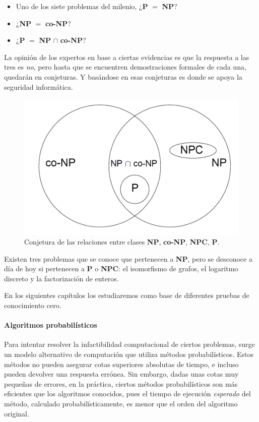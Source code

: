 \begin{itemize}
	\item Uno de los siete problemas del milenio, ¿\textbf{P} $=$ \textbf{NP}?
	\item ¿\textbf{NP} $=$ \textbf{co-NP}?
	\item ¿\textbf{P} $=$ \textbf{NP} $\cap$ \textbf{co-NP}?
\end{itemize}


La opinión de los expertos en base a ciertas evidencias es que la respuesta a las tres es \textit{no}, pero hasta que se encuentren demostraciones formales de cada una, quedarán en conjeturas. Y basándose en esas conjeturas es donde se apoya la seguridad informática.


\begin{figure}[bth]
	\begin{center}
		\includegraphics[width=.45\linewidth]{gfx/NPclasses}
	\end{center}
	\caption{Conjetura de las relaciones entre clases \textbf{NP}, \textbf{co-NP}, \textbf{NPC}, \textbf{P}.}
	\label{fig:NPclasses}
\end{figure}


Existen tres problemas que se conoce que pertenecen a \textbf{NP}, pero se desconoce a día de hoy si pertenecen a \textbf{P} o \textbf{NPC}: el isomorfismo de grafos, el logaritmo discreto y la factorización de enteros.

En los siguientes capítulos los estudiaremos como base de diferentes pruebas de conocimiento cero.


\hfil


\paragraph{Algoritmos probabilísticos} 

\hfil

Para intentar resolver la infactibilidad computacional de ciertos problemas, surge un modelo alternativo de computación que utiliza métodos probabilísticos. Estos métodos no pueden asegurar cotas superiores absolutas de tiempo, e incluso pueden devolver una respuesta errónea. Sin embargo, dadas unas cotas muy pequeñas de errores, en la práctica, ciertos métodos probabilísticos son más eficientes que los algoritmos conocidos, pues el tiempo de ejecución \textit{esperado} del método, calculado probabilísticamente, es menor que el orden del algoritmo original.


